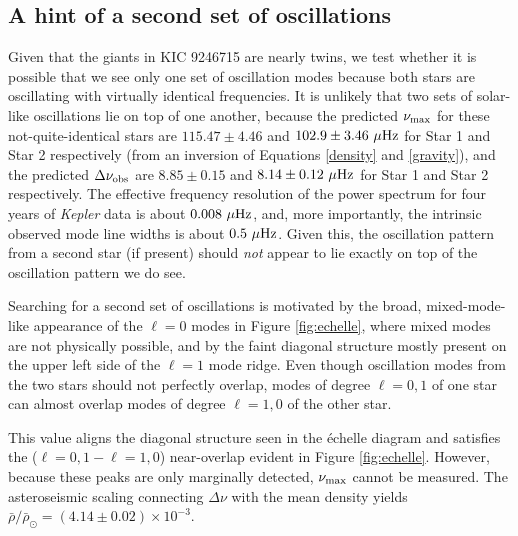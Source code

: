 \subsection{A hint of a second set of oscillations}
\label{subsec_second_osc}
Given that the giants in KIC 9246715 are nearly twins, we test whether it is possible that we see only one set of oscillation modes because both stars are oscillating with virtually identical frequencies. It is unlikely that two sets of solar-like oscillations lie on top of one another, because the predicted $\nu_{\rm{max}}$ for these not-quite-identical stars are $115.47 \pm 4.46$ and $102.9 \pm 3.46 \ \mu\rm{Hz}$ for Star 1 and Star 2 respectively (from an inversion of Equations \ref{density} and \ref{gravity}), and the predicted $\Delta\nu_{\rm{obs}}$ are $8.85 \pm 0.15$ and $8.14 \pm 0.12 \ \mu\rm{Hz}$ for Star 1 and Star 2 respectively. The effective frequency resolution of the power spectrum for four years of \emph{Kepler} data is about $0.008 \ \mu \rm{Hz}$, and, more importantly, the intrinsic observed mode line widths is about $0.5 \ \mu \rm{Hz}$. Given this, the oscillation pattern from a second star (if present) should \emph{not} appear to lie exactly on top of the oscillation pattern we do see.

Searching for a second set of oscillations is motivated by the broad, mixed-mode-like appearance of the $\ell=0$ modes in Figure \ref{fig:echelle}, where mixed modes are not physically possible, and by the faint diagonal structure mostly present on the upper left side of the $\ell=1$ mode ridge. Even though oscillation modes from the two stars should not perfectly overlap, modes of degree $\ell=0,1$ of one star can almost overlap modes of degree $\ell=1,0$ of the other star.


This value aligns the diagonal structure seen in the \'echelle diagram and satisfies the ($\ell=0,1-\ell=1,0$) near-overlap evident in Figure \ref{fig:echelle}. However, because these peaks are only marginally detected, $\nu_{\rm{max}}$ cannot be measured. The asteroseismic scaling connecting $\Delta\nu$ with the mean density yields $\bar{\rho}/\bar{\rho}_\odot = (4.14 \pm 0.02)\times 10^{-3}$. 

